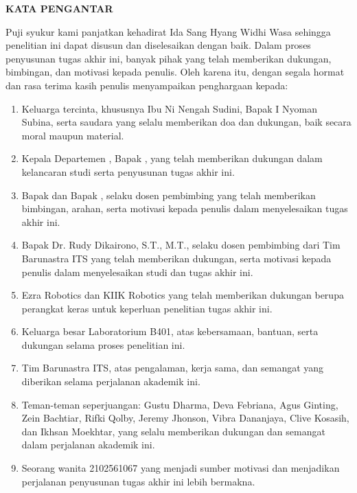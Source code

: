 \begin{center}
  \Large
  \textbf{KATA PENGANTAR}
\end{center}


\vspace{2ex}


Puji syukur kami panjatkan kehadirat Ida Sang Hyang Widhi Wasa  sehingga penelitian ini dapat disusun dan diselesaikan dengan baik. Dalam proses penyusunan tugas akhir ini, banyak pihak yang telah memberikan dukungan, bimbingan, dan motivasi kepada penulis. Oleh karena itu, dengan segala hormat dan rasa terima kasih  penulis menyampaikan penghargaan kepada:

\begin{enumerate}[nolistsep]
  \item Keluarga tercinta, khususnya Ibu Ni Nengah Sudini, Bapak I Nyoman Subina, serta saudara yang selalu memberikan doa dan dukungan, baik secara moral maupun material.
  \item Kepala Departemen \studyprogram{}, Bapak \headofdepartment{}, yang telah memberikan dukungan dalam kelancaran studi serta penyusunan tugas akhir ini.
  \item Bapak \advisor{} dan Bapak \coadvisor{}, selaku dosen pembimbing yang telah memberikan bimbingan, arahan, serta motivasi kepada penulis dalam menyelesaikan tugas akhir ini.
  \item Bapak Dr. Rudy Dikairono, S.T., M.T., selaku dosen pembimbing dari Tim Barunastra ITS yang telah memberikan dukungan, serta motivasi kepada penulis dalam menyelesaikan studi dan tugas akhir ini.
  \item Ezra Robotics dan KIIK Robotics yang telah memberikan dukungan berupa perangkat keras untuk keperluan penelitian tugas akhir ini.
  \item Keluarga besar Laboratorium B401, atas kebersamaan, bantuan, serta dukungan selama proses penelitian ini.
  \item Tim Barunastra ITS, atas pengalaman, kerja sama, dan semangat yang diberikan selama perjalanan akademik ini.
  \item Teman-teman seperjuangan: Gustu Dharma, Deva Febriana, Agus Ginting, Zein Bachtiar, Rifki Qolby, Jeremy Jhonson, Vibra Dananjaya, Clive Kosasih, dan Ikhsan Moekhtar, yang selalu memberikan dukungan dan semangat dalam perjalanan akademik ini.
  \item Seorang wanita 2102561067 yang menjadi sumber motivasi dan menjadikan perjalanan penyusunan tugas akhir ini lebih bermakna.
\end{enumerate}

